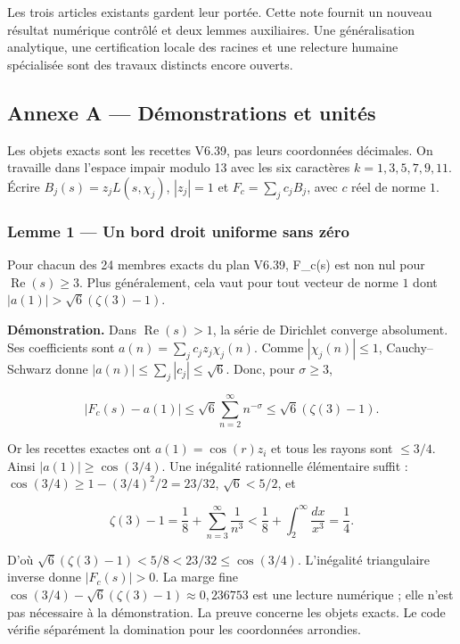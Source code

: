 \documentclass[
  10pt,
  a4paper,
]{article}
\begin{document}
Les trois articles existants gardent leur portée. Cette note fournit un
nouveau résultat numérique contrôlé et deux lemmes auxiliaires. Une
généralisation analytique, une certification locale des racines et une
relecture humaine spécialisée sont des travaux distincts encore ouverts.

\newpage

\hypertarget{annexe-a-duxe9monstrations-et-unituxe9s}{%
\subsection{Annexe A --- Démonstrations et
unités}\label{annexe-a-duxe9monstrations-et-unituxe9s}}

Les objets exacts sont les recettes V6.39, pas leurs coordonnées
décimales. On travaille dans l'espace impair modulo 13 avec les six
caractères \(k=1,3,5,7,9,11\). Écrire \(B_j(s)=z_jL(s,\chi_j)\),
\(|z_j|=1\) et \(F_c=\sum_j c_jB_j\), avec \(c\) réel de norme \(1\).

\hypertarget{lemme-1-un-bord-droit-uniforme-sans-zuxe9ro}{%
\subsubsection{Lemme 1 --- Un bord droit uniforme sans
zéro}\label{lemme-1-un-bord-droit-uniforme-sans-zuxe9ro}}

Pour chacun des 24 membres exacts du plan V6.39, F\_c(s) est non nul
pour \(\operatorname{Re}(s)\geq3\). Plus généralement, cela vaut pour
tout vecteur de norme \(1\) dont \(|a(1)|>\sqrt6(\zeta(3)-1)\).

\textbf{Démonstration.} Dans \(\operatorname{Re}(s)>1\), la série de
Dirichlet converge absolument. Ses coefficients sont
\(a(n)=\sum_j c_jz_j\chi_j(n)\). Comme \(|\chi_j(n)|\leq1\),
Cauchy--Schwarz donne \(|a(n)|\leq\sum_j|c_j|\leq\sqrt6\). Donc, pour
\(\sigma\geq3\),

\[
 |F_c(s)-a(1)|\leq\sqrt6\sum_{n=2}^{\infty}n^{-\sigma}
 \leq\sqrt6(\zeta(3)-1).
\]

Or les recettes exactes ont \(a(1)=\cos(r)z_i\) et tous les rayons sont
\(\leq3/4\). Ainsi \(|a(1)|\geq\cos(3/4)\). Une inégalité rationnelle
élémentaire suffit : \(\cos(3/4)\geq1-(3/4)^2/2=23/32\), \(\sqrt6<5/2\),
et

\[
\zeta(3)-1=\frac18+\sum_{n=3}^{\infty}\frac1{n^3}
<\frac18+\int_2^{\infty}\frac{dx}{x^3}=\frac14.
\]

D'où \(\sqrt6(\zeta(3)-1)<5/8<23/32\leq\cos(3/4)\). L'inégalité
triangulaire inverse donne \(|F_c(s)|>0\). La marge fine
\(\cos(3/4)-\sqrt6(\zeta(3)-1)\approx0{,}236753\) est une lecture
numérique ; elle n'est pas nécessaire à la démonstration. La preuve
concerne les objets exacts. Le code vérifie séparément la domination
pour les coordonnées arrondies.
\end{document}
